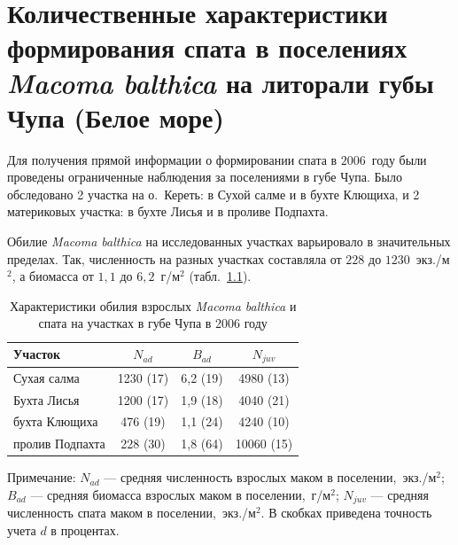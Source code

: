 	\chapter{Количественные характеристики формирования спата в поселениях {\it Macoma balthica}  на литорали губы Чупа (Белое море)}
Для получения прямой информации о формировании спата в $2006$~году были проведены ограниченные наблюдения за поселениями в губе Чупа.
Было обследовано 2 участка на о.~Кереть: в Сухой салме и в бухте Клющиха, и 2 материковых участка: в бухте Лисья и в проливе Подпахта.

Обилие {\it Macoma balthica} на исследованных участках варьировало в значительных пределах. 
Так, численность на разных участках составляла от $228$ до $1230$~экз./м$^2$, а биомасса от $1,1$ до $6,2$~г/м$^2$ (табл.~\ref{tab:NMacoma_recruitment}). 
\begin{table}[p]
\caption{Характеристики обилия взрослых {\it Macoma balthica} и спата на участках в губе Чупа в 2006 году}
\label{tab:NMacoma_recruitment}
\begin{center}
\begin{tabular}{|l|cc|c|}
\hline
Участок         & $N_{ad}$  & $B_{ad}$   & $N_{juv}$ \\ \hline
Сухая салма     & 1230 (17) & 6,2 (19) & 4980 (13)  \\  
Бухта Лисья     & 1200 (17) & 1,9 (18) & 4040 (21)  \\ 
бухта Клющиха   & 476 (19)  & 1,1 (24) & 4240 (10)  \\  
пролив Подпахта & 228 (30)  & 1,8 (64) & 10060 (15) \\ \hline
\end{tabular}
\end{center}

\footnotesize{Примечание: $N_{ad}$ --- средняя численность взрослых маком в поселении,~экз./м$^2$; 
$B_{ad}$ --- средняя биомасса взрослых маком в поселении,~г/м$^2$; 
$N_{juv}$ --- средняя численность спата маком в поселении,~экз./м$^2$. 
В скобках приведена точность учета $d$ в процентах.}
\end{table}

